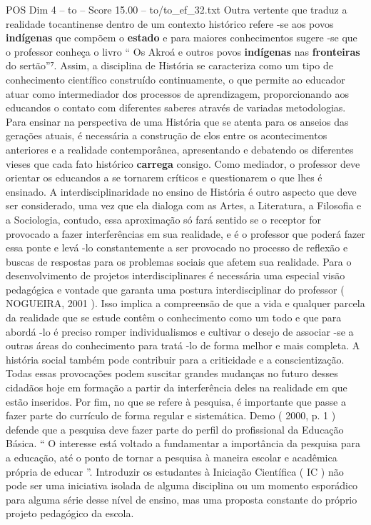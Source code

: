 \begin{textsample}{POS Dim 4 – to – Score 15.00 – to/to\_ef\_32.txt}
Outra vertente que traduz a realidade tocantinense dentro de um contexto histórico refere -se aos povos \textbf{indígenas} que compõem o \textbf{estado} e para maiores conhecimentos sugere -se que o professor conheça o livro “ Os Akroá e outros povos \textbf{indígenas} nas \textbf{fronteiras} do sertão”⁷.
Assim, a disciplina de História se caracteriza como um tipo de conhecimento científico construído continuamente, o que permite ao educador atuar como intermediador dos processos de aprendizagem, proporcionando aos educandos o contato com diferentes saberes através de variadas metodologias.
Para ensinar na perspectiva de uma História que se atenta para os anseios das gerações atuais, é necessária a construção de elos entre os acontecimentos anteriores e a realidade contemporânea, apresentando e debatendo os diferentes vieses que cada fato histórico \textbf{carrega} consigo.
Como mediador, o professor deve orientar os educandos a se tornarem críticos e questionarem o que lhes é ensinado.
A interdisciplinaridade no ensino de História é outro aspecto que deve ser considerado, uma vez que ela dialoga com as Artes, a Literatura, a Filosofia e a Sociologia, contudo, essa aproximação só fará sentido se o receptor for provocado a fazer interferências em sua realidade, e é o professor que poderá fazer essa ponte e levá -lo constantemente a ser provocado no processo de reflexão e buscas de respostas para os problemas sociais que afetem sua realidade.
Para o desenvolvimento de projetos interdisciplinares é necessária uma especial visão pedagógica e vontade que garanta uma postura interdisciplinar do professor ( NOGUEIRA, 2001 ).
Isso implica a compreensão de que a vida e qualquer parcela da realidade que se estude contêm o conhecimento como um todo e que para abordá -lo é preciso romper individualismos e cultivar o desejo de associar -se a outras áreas do conhecimento para tratá -lo de forma melhor e mais completa.
A história social também pode contribuir para a criticidade e a conscientização.
Todas essas provocações podem suscitar grandes mudanças no futuro desses cidadãos hoje em formação a partir da interferência deles na realidade em que estão inseridos.
Por fim, no que se refere à pesquisa, é importante que passe a fazer parte do currículo de forma regular e sistemática.
Demo ( 2000, p. 1 ) defende que a pesquisa deve fazer parte do perfil do profissional da Educação Básica. “ O interesse está voltado a fundamentar a importância da pesquisa para a educação, até o ponto de tornar a pesquisa à maneira escolar e acadêmica própria de educar ”.
Introduzir os estudantes à Iniciação Científica ( IC ) não pode ser uma iniciativa isolada de alguma disciplina ou um momento esporádico para alguma série desse nível de ensino, mas uma proposta constante do próprio projeto pedagógico da escola.

\end{textsample}
